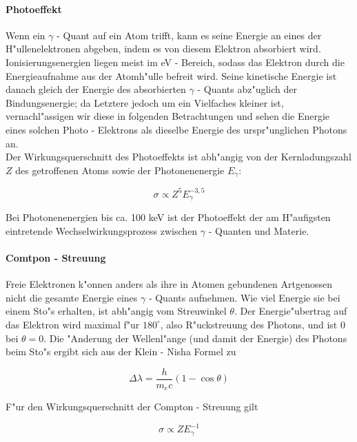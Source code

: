 \documentclass{article}
\begin{document}
\paragraph{Photoeffekt}


Wenn ein $\gamma$ - Quant auf ein Atom trifft, kann es seine Energie an eines der H"ullenelektronen abgeben, indem es von diesem Elektron absorbiert wird. Ionisierungsenergien liegen meist im eV - Bereich, sodass das Elektron durch die Energieaufnahme aus der Atomh"ulle befreit wird. Seine kinetische Energie ist danach gleich der Energie des absorbierten $\gamma$ - Quants abz"uglich der Bindungsenergie; da Letztere jedoch um ein Vielfaches kleiner ist, vernachl"assigen wir diese in folgenden Betrachtungen und sehen die Energie eines solchen Photo - Elektrons als dieselbe Energie des urspr"unglichen Photons an.\\
Der Wirkungsquerschnitt des Photoeffekts ist abh"angig von der Kernladungszahl $Z$ des getroffenen Atoms sowie der Photonenenergie $E_{\gamma}$:

	\begin{equation}
		\sigma \propto Z^5 E^{-3,5}_{\gamma}
	\end{equation}

Bei Photonenenergien bis ca. 100 keV ist der Photoeffekt der am H"aufigsten eintretende Wechselwirkungsprozess zwischen $\gamma$ - Quanten und Materie.


\paragraph{Comtpon - Streuung}

Freie Elektronen k"onnen anders als ihre in Atomen gebundenen Artgenossen nicht die gesamte Energie eines $\gamma$ - Quants aufnehmen. Wie viel Energie sie bei einem Sto"s erhalten, ist abh"angig vom Streuwinkel $\theta$. Der Energie"ubertrag auf das Elektron wird maximal f"ur $180^{\circ}$, also R"uckstreuung des Photons, und ist 0 bei $\theta = 0$. Die "Anderung der Wellenl"ange (und damit der Energie) des Photons beim Sto"s ergibt sich aus der Klein - Nisha Formel zu

	\begin{equation}
		\Delta \lambda = \frac{h}{m_{e}c}(1-\cos{\theta})
		\label{eq:com}
	\end{equation}

F"ur den Wirkungsquerschnitt der Compton - Streuung gilt

	\begin{equation}
		\sigma \propto ZE^{-1}_{\gamma}
	\end{equation}
\end{document}
